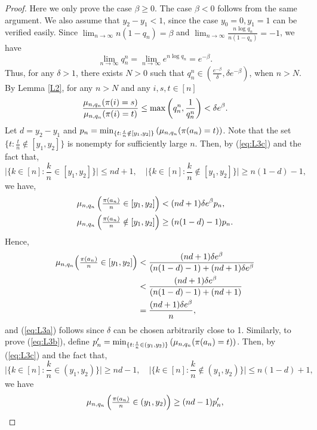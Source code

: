 \begin{proof}
Here we only prove the case $\beta \ge 0$. The case $\beta < 0$ follows from the same argument. We also assume that $y_2 - y_1 < 1$, since the case $y_0 = 0, y_1 = 1$ can be verified easily.
Since $\lim_{n \to \infty} n (1-q_n) = \beta$ and $\lim_{n \to \infty} \frac{n \log{q_n}}{n(1 - q_n)} = -1$, we have
\[
\lim_{n \to \infty} q_n^n = \lim_{n \to \infty} e^{n \log{q_n}} = e^{-\beta}.
\]
Thus, for any $\delta >1 $, there exists $N>0$ such that $q_n^n \in \left( \frac{e^{-\beta}}{\delta}, \delta e^{-\beta}\right) $, when $n > N$.
By Lemma \ref{L2}, for any $n > N$ and any $i, s, t \in [n]$
\begin{equation}
\frac{\mu_{n, q_n} (\pi(i) = s)} {\mu_{n, q_n} (\pi(i) = t)} \le \max \left( q_n^n , \frac{1}{q_n^n} \right) < \delta e^{\beta}. \label{eq:L3c}
\end{equation}
Let $d = y_2 - y_1$ and $p_n = \min_{\{t: \frac{t}{n} \notin [y_1, y_2] \}} \left( \mu_{n, q_n} (\pi(a_n) = t) \right)$. Note that the set $\{t: \frac{t}{n} \notin [y_1, y_2] \}$ is nonempty for sufficiently large $n$.
Then, by (\ref{eq:L3c}) and the fact that,
\[
\textstyle\Big|\Big\{k \in [n] :\frac{k}{n} \in [y_1, y_2]\Big\}\Big| \le nd+1, \quad \Big|\Big\{k \in [n]:\frac{k}{n} \notin [y_1, y_2]\Big\}\Big| \ge n(1-d)-1,
\]
we have,
\begin{align*}
\textstyle\mu_{n, q_n} \left(\frac{\pi(a_n)}{n} \in [y_1, y_2] \right) &< (nd+1)\delta e^{\beta} p_n,\\
\textstyle\mu_{n, q_n} \left(\frac{\pi(a_n)}{n} \notin [y_1, y_2] \right) &\ge (n(1-d) -1) p_n.
\end{align*}
Hence,
\begin{align*}
\mu_{n, q_n} \Big(\textstyle\frac{\pi(a_n)}{n} \in [y_1, y_2] \Big) &< \frac{(nd+1)\delta e^{\beta}} {(n(1-d) -1)+(nd+1)\delta e^{\beta}}\\
 &< \frac{(nd+1)\delta e^{\beta}} {(n(1-d) -1)+(nd+1)}\\
 &= \frac{(nd+1)\delta e^{\beta}} {n},
\end{align*}
and (\ref{eq:L3a}) follows since $\delta$ can be chosen arbitrarily close to 1.
Similarly, to prove (\ref{eq:L3b}), define $p'_n = \min_{\{t: \frac{t}{n} \in (y_1, y_2) \}} \left( \mu_{n, q_n} (\pi(a_n) = t) \right)$.
Then, by (\ref{eq:L3c}) and the fact that,
\[
\textstyle\Big|\Big\{k \in [n] :\frac{k}{n} \in (y_1, y_2)\Big\}\Big| \ge nd-1, \quad \Big|\Big\{k \in [n]:\frac{k}{n} \notin (y_1, y_2)\Big\}\Big| \le n(1-d)+1,
\]
we have
\begin{align*}
\textstyle\n \left(\frac{\pi(a_n)}{n} \in (y_1, y_2) \right) &\ge (nd-1)p'_n,\\

\end{align*}
\end{proof}
